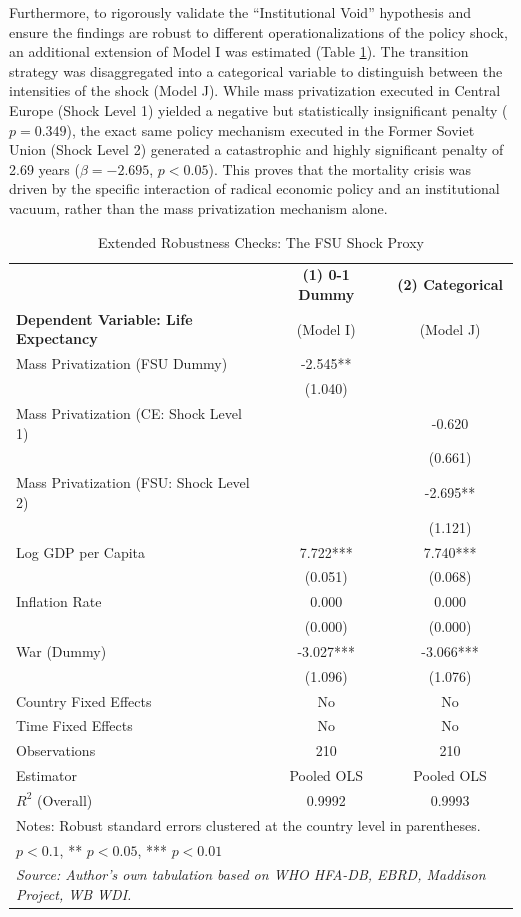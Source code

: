 \documentclass[en,magisterska]{pracamgr}
\begin{document}
Furthermore, to rigorously validate the ``Institutional Void'' hypothesis and ensure the findings are robust to different operationalizations of the policy shock, an additional 
extension of Model I was estimated (Table \ref{tab:shock_proxy}). The transition strategy was disaggregated into a categorical variable to distinguish between the intensities of 
the shock (Model J). While mass privatization executed in Central Europe (Shock Level 1) yielded a negative but statistically insignificant penalty ($p = 0.349$), the exact same 
policy mechanism executed in the Former Soviet Union (Shock Level 2) generated a catastrophic and highly significant penalty of 2.69 years ($\beta = -2.695$, $p < 0.05$). This proves 
that the mortality crisis was driven by the specific interaction of radical economic policy and an institutional vacuum, rather than the mass privatization mechanism alone.

\begin{table}[H]
\centering
\caption{Extended Robustness Checks: The FSU Shock Proxy}
\label{tab:shock_proxy}
\footnotesize
\begin{tabular}{l c c}
\toprule
 & \textbf{(1) 0-1 Dummy} & \textbf{(2) Categorical} \\
\textbf{Dependent Variable: Life Expectancy} & (Model I) & (Model J) \\
\midrule
Mass Privatization (FSU Dummy) & -2.545** & \\
 & (1.040) & \\
Mass Privatization (CE: Shock Level 1) & & -0.620 \\
 & & (0.661) \\
Mass Privatization (FSU: Shock Level 2) & & -2.695** \\
 & & (1.121) \\
Log GDP per Capita & 7.722*** & 7.740*** \\
 & (0.051) & (0.068) \\
Inflation Rate & 0.000 & 0.000 \\
 & (0.000) & (0.000) \\
War (Dummy) & -3.027*** & -3.066*** \\
 & (1.096) & (1.076) \\
\midrule
Country Fixed Effects & No & No \\
Time Fixed Effects & No & No \\
Observations & 210 & 210 \\
Estimator & Pooled OLS & Pooled OLS \\
$R^2$ (Overall) & 0.9992 & 0.9993 \\
\bottomrule
\multicolumn{3}{l}{\scriptsize Notes: Robust standard errors clustered at the country level in parentheses.} \\
\multicolumn{3}{l}{\scriptsize * $p < 0.1$, ** $p < 0.05$, *** $p < 0.01$} \\
\multicolumn{3}{l}{\scriptsize \textit{Source: Author's own tabulation based on WHO HFA-DB, EBRD, Maddison Project, WB WDI.}} \\
\end{tabular}
\end{table}
\end{document}
